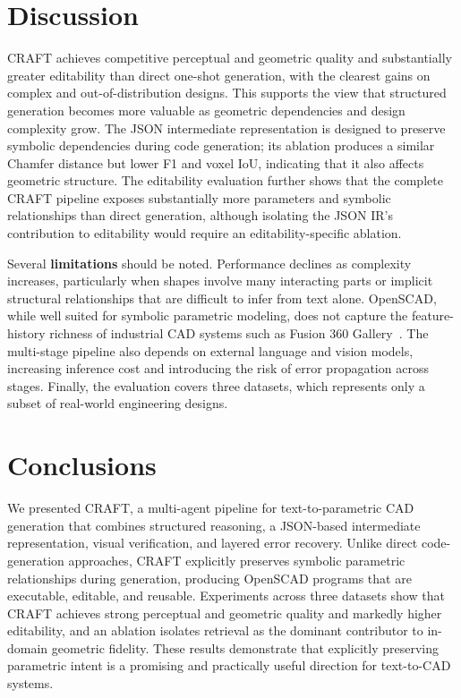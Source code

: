 \documentclass[conference]{IEEEtran}
\begin{document}
\section{Discussion}
\label{Sec:discussion}

CRAFT achieves competitive perceptual and geometric quality and substantially greater editability than direct one-shot generation, with the clearest gains on complex and out-of-distribution designs. This supports the view that structured generation becomes more valuable as geometric dependencies and design complexity grow. The JSON intermediate representation is designed to preserve symbolic dependencies during code generation; its ablation produces a similar Chamfer distance but lower F1 and voxel IoU, indicating that it also affects geometric structure. The editability evaluation further shows that the complete CRAFT pipeline exposes substantially more parameters and symbolic relationships than direct generation, although isolating the JSON IR's contribution to editability would require an editability-specific ablation.

Several \textbf{limitations} should be noted. Performance declines as complexity increases, particularly when shapes involve many interacting parts or implicit structural relationships that are difficult to infer from text alone. OpenSCAD, while well suited for symbolic parametric modeling, does not capture the feature-history richness of industrial CAD systems such as Fusion 360 Gallery~\citep{fusion360gallery2021}. The multi-stage pipeline also depends on external language and vision models, increasing inference cost and introducing the risk of error propagation across stages. Finally, the evaluation covers three datasets, which represents only a subset of real-world engineering designs.

\section{Conclusions}
\label{Sec:conclusion}

We presented CRAFT, a multi-agent pipeline for text-to-parametric CAD generation that combines structured reasoning, a JSON-based intermediate representation, visual verification, and layered error recovery. Unlike direct code-generation approaches, CRAFT explicitly preserves symbolic parametric relationships during generation, producing OpenSCAD programs that are executable, editable, and reusable. Experiments across three datasets show that CRAFT achieves strong perceptual and geometric quality and markedly higher editability, and an ablation isolates retrieval as the dominant contributor to in-domain geometric fidelity. These results demonstrate that explicitly preserving parametric intent is a promising and practically useful direction for text-to-CAD systems.

{
\small


}
\end{document}
